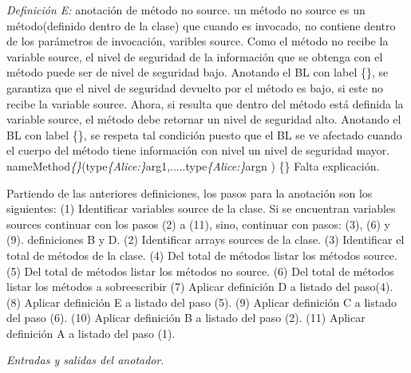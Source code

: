 \textit{Definición E:} anotación de método no source.\newline
un método no source es un método(definido dentro de la clase) que cuando es
invocado, no contiene dentro de los parámetros de invocación, varibles source.
Como el método no recibe la variable source, el nivel de seguridad de la
información que se obtenga con el método puede ser de nivel de seguridad bajo.
Anotando el BL con label {\{\}}, se garantiza que el nivel de seguridad devuelto
por el método es bajo, si este no recibe la variable source.
Ahora,  si resulta que dentro del método está definida la variable source, el
método debe retornar un nivel de seguridad alto. Anotando el BL con
label {\{\}}, se respeta tal condición puesto que el BL se ve afectado cuando
el cuerpo del método tiene información con nivel un nivel de seguridad
mayor.\newline 
nameMethod\textit{\{\}}(type\textit{\{Alice:\}}arg1,.....type\textit{\{Alice:\}}argn ) \{\}\newline
Falta explicación.

Partiendo de las anteriores definiciones, los pasos para la anotación son los
siguientes:\newline
(1) Identificar variables source de la clase. Si se encuentran variables sources
continuar con los pasos (2) a (11), sino, continuar con pasos: (3), (6) y (9).
definiciones B y D.\newline
(2) Identificar arrays sources de la clase.
(3) Identificar el total de métodos de la clase.\newline
(4) Del total de métodos listar los métodos source.\newline
(5) Del total de métodos listar los métodos no source.\newline
(6) Del total de métodos listar los métodos a sobreescribir\newline
(7) Aplicar definición D a listado del paso(4).\newline
(8) Aplicar definición E a listado del paso (5).\newline
(9) Aplicar definición C a listado del paso (6).\newline
(10) Aplicar definición B a listado del paso (2).\newline
(11) Aplicar definición A a listado del paso (1).\newline

\textit{Entradas y salidas del anotador}.

